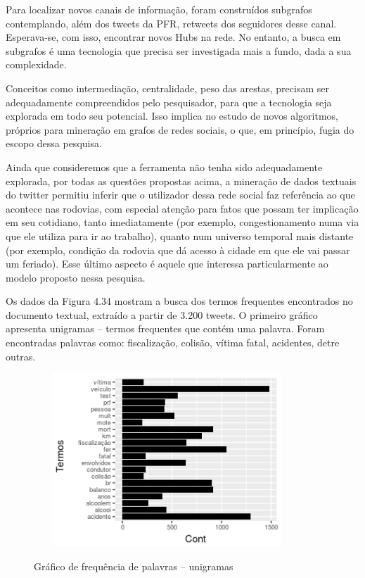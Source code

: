 Para localizar novos canais de informação, foram construídos subgrafos contemplando, além dos tweets da PFR, retweets dos seguidores desse canal. Esperava-se, com isso, encontrar novos Hubs na rede. No entanto, a busca em subgrafos é uma tecnologia que precisa ser investigada mais a fundo, dada a sua complexidade.

Conceitos como intermediação, centralidade, peso das arestas, precisam ser adequadamente compreendidos pelo pesquisador, para que a tecnologia seja explorada em todo seu potencial. Isso implica no estudo de novos algoritmos, próprios para mineração em grafos de redes sociais, o que, em princípio, fugia do escopo dessa pesquisa.

Ainda que consideremos que a ferramenta não tenha sido adequadamente explorada, por todas as questões propostas acima, a mineração de dados textuais do twitter permitiu inferir que o utilizador dessa rede social faz referência ao que acontece nas rodovias, com especial atenção para fatos que possam ter implicação em seu cotidiano, tanto imediatamente (por exemplo, congestionamento numa via que ele utiliza para ir ao trabalho), quanto num universo temporal mais distante (por exemplo, condição da rodovia que dá acesso à cidade em que ele vai passar um feriado). Esse último aspecto é aquele que interessa particularmente ao modelo proposto nessa pesquisa.


Os dados da Figura 4.34 mostram a busca dos termos frequentes encontrados no documento textual, extraído a partir de 3.200 tweets. O primeiro gráfico apresenta unigramas -- termos frequentes que contém uma palavra. Foram encontradas palavras como: fiscalização, colisão, vítima fatal, acidentes, detre outras. 



\begin{figure}[!ht]
\centering
\caption{Gráfico de frequência de palavras -- unigramas}
\includegraphics[width=100mm, height=65mm]{Figuras/Twitter/freqPalavr}
\label{fig:freqPalavras}
\end{figure}

